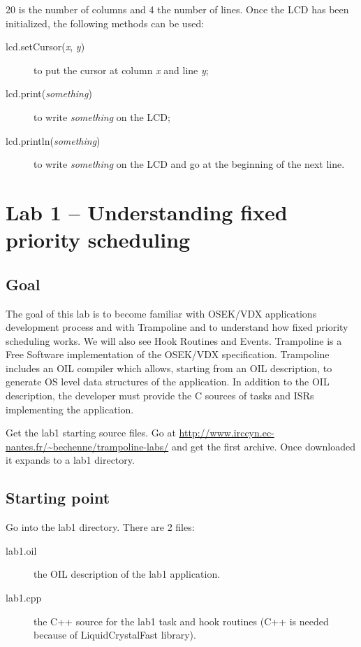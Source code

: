 \documentclass[11pt]{report}
\begin{document}
20 is the number of columns and 4 the number of lines. Once the LCD has been initialized, the following methods can be used:
\begin{description}
\item[lcd.setCursor({\it x}, {\it y})] to put the cursor at column {\it x} and line {\it y};
\item[lcd.print({\it something})] to write {\it something} on the LCD;
\item[lcd.println({\it something})] to write {\it something} on the LCD and go at the beginning of the next line.
\end{description}

\chapter{Lab 1 -- Understanding fixed priority scheduling}

\section{Goal}

The goal of this lab is to become familiar with OSEK/VDX applications development process and with Trampoline and to understand how fixed priority scheduling works.
We will also see Hook Routines and Events.
Trampoline is a Free Software implementation of the OSEK/VDX specification.
Trampoline includes an OIL compiler which allows, starting from an OIL description, to generate OS level data structures of the application.
In addition to the OIL description, the developer must provide the C sources of tasks and ISRs implementing the application.

Get the lab1 starting source files. Go at \url{http://www.irccyn.ec-nantes.fr/~bechenne/trampoline-labs/} and get the first archive. Once downloaded it expands to a lab1 directory.

\section{Starting point}

Go into the lab1 directory. There are 2 files:

\begin{description}
\item[lab1.oil] the OIL description of the lab1 application.
\item[lab1.cpp] the C++ source for the lab1 task and hook routines (C++ is needed because of LiquidCrystalFast library).
\end{description}
\end{document}
